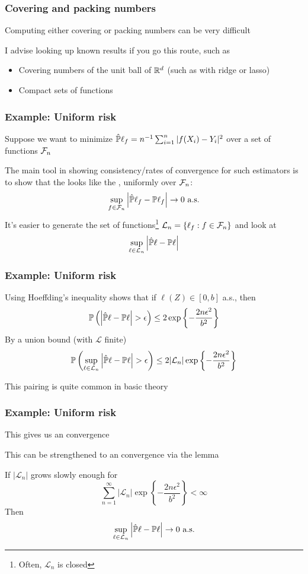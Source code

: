 \documentclass[12pt]{beamer}
\begin{document}
\begin{frame}[fragile]
\frametitle{Covering and packing numbers}
Computing either covering or packing numbers can be very difficult

\vsp
I advise looking up known results if you go this route, such as
\begin{itemize}
\item Covering numbers of the unit ball of $\R^d$ (such as with ridge or lasso)
\item Compact sets of functions
\end{itemize}
\end{frame}



\begin{frame}[fragile]
\frametitle{Example: Uniform risk}
Suppose we want to minimize $\hat\P\ell_f = n^{-1} \sum_{i=1}^n |f(X_i) - Y_i|^2$ over a set of functions $\F_n$

\vsp
The main tool in showing consistency/rates of convergence for such estimators is to show
that the  looks like the , uniformly over $\F_n$:
\[
\sup_{f \in \F_n} \left| \hat\P\ell_f - \P\ell_f \right| \rightarrow 0 \textrm{ a.s.}
\]
It's easier to generate the set of functions\footnote{Often, $\mathcal{L}_n$ is closed} $\mathcal{L}_n =\{\ell_f : f\in \F_n\}$ and look at
\[
\sup_{\ell \in \mathcal{L}_n} \left| \hat\P\ell - \P\ell \right|
\]
\end{frame}

\begin{frame}[fragile]
\frametitle{Example: Uniform risk }
Using Hoeffding's inequality shows that if $\ell(Z) \in [0,b]$ a.s., then
\[
\P\left( \left|  \hat\P\ell - \P\ell \right| > \epsilon \right) \leq 2 \exp\left\{ -\frac{2n\epsilon^2}{b^2}\right\}
\]
By a union bound (with $\mathcal{L}$ finite)
\[
\P\left(\sup_{\ell \in \mathcal{L}_n} \left|  \hat\P\ell - \P\ell \right| > \epsilon \right) \leq 2 |\mathcal{L}_n| \exp\left\{ -\frac{2n\epsilon^2}{b^2}\right\}
\]

\vsp
This pairing is quite common in basic theory
\end{frame}

\begin{frame}[fragile]
\frametitle{Example: Uniform risk }
This gives us an  convergence

\vsp
This can be strengthened to an  convergence via the  lemma

\vsp
If $|\mathcal{L}_n|$ grows slowly enough for
\[
\sum_{n=1}^\infty |\mathcal{L}_n| \exp\left\{ -\frac{2n\epsilon^2}{b^2}\right\} < \infty
\]
Then
\[
\sup_{\ell \in \mathcal{L}_n} \left| \hat\P\ell - \P\ell \right| \rightarrow 0 \textrm{ a.s.}
\]
\end{frame}
\end{document}
